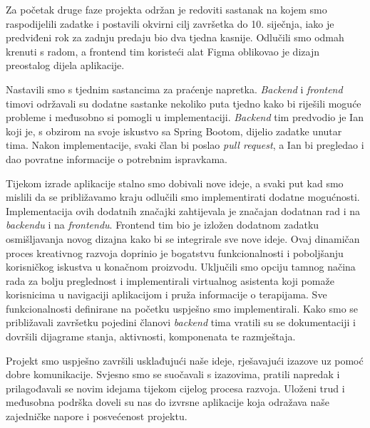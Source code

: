 Za početak druge faze projekta održan je redoviti sastanak na kojem smo raspodijelili zadatke i postavili okvirni cilj završetka do 10. siječnja, iako je predviđeni rok za zadnju predaju bio dva tjedna kasnije. Odlučili smo odmah krenuti s radom, a frontend tim koristeći alat Figma oblikovao je dizajn preostalog dijela aplikacije.

Nastavili smo s tjednim sastancima za praćenje napretka. \textit{Backend} i \textit{frontend} timovi održavali su dodatne sastanke nekoliko puta tjedno kako bi riješili moguće probleme i međusobno si pomogli u implementaciji. \textit{Backend} tim predvodio je Ian koji je, s obzirom na svoje iskustvo sa Spring Bootom, dijelio zadatke unutar tima. Nakon implementacije, svaki član bi poslao \textit{pull request}, a Ian bi pregledao i dao povratne informacije o potrebnim ispravkama.

Tijekom izrade aplikacije stalno smo dobivali nove ideje, a svaki put kad smo mislili da se približavamo kraju odlučili smo implementirati dodatne mogućnosti. Implementacija ovih dodatnih značajki zahtijevala je značajan dodatnan rad i na \textit{backendu} i na \textit{frontendu}. Frontend tim bio je izložen dodatnom zadatku osmišljavanja novog dizajna kako bi se integrirale sve nove ideje. Ovaj dinamičan proces kreativnog razvoja doprinio je bogatstvu funkcionalnosti i poboljšanju korisničkog iskustva u konačnom proizvodu. Uključili smo opciju tamnog načina rada za bolju preglednost i implementirali virtualnog asistenta koji pomaže korisnicima u navigaciji aplikacijom i pruža informacije o terapijama. Sve funkcionalnosti definirane na početku uspješno smo implementirali. Kako smo se približavali završetku pojedini članovi \textit{backend} tima vratili su se dokumentaciji i dovršili dijagrame stanja, aktivnosti, komponenata te razmještaja. 

Projekt smo uspješno završili usklađujući naše ideje, rješavajući izazove uz pomoć dobre komunikacije. Svjesno smo se suočavali s izazovima, pratili napredak i prilagođavali se novim idejama tijekom cijelog procesa razvoja. Uloženi trud i međusobna podrška doveli su nas do izvrsne aplikacije koja odražava naše zajedničke napore i posvećenost projektu. 
